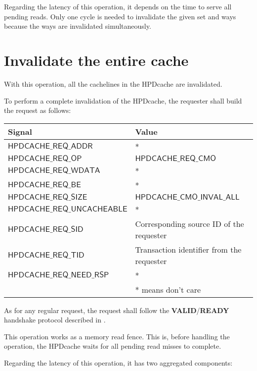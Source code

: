 \documentclass[10pt,titlepage,twoside]{book}
\begin{document}
Regarding the latency of this operation, it depends on the time to serve all pending reads.
Only one cycle is needed to invalidate the given set and ways because the ways are invalidated simultaneously.


\newpage
\section{Invalidate the entire cache}

With this operation, all the cachelines in the \ac{HPDcache} are invalidated.

To perform a complete invalidation of the \ac{HPDcache}, the requester shall build the request as follows:

{\centering\footnotesize\begin{tabular}{p{.38\linewidth}p{.55\linewidth}}
  \toprule
  \textbf{Signal}
  & \textbf{Value} \\
  \midrule
  $\mathsf{HPDCACHE\_REQ\_ADDR}$
  & *\\
  \midrule
  $\mathsf{HPDCACHE\_REQ\_OP}$
  & $\mathsf{HPDCACHE\_REQ\_CMO}$ \\
  \midrule
  $\mathsf{HPDCACHE\_REQ\_WDATA}$
  & *\\
  \midrule
  $\mathsf{HPDCACHE\_REQ\_BE}$
  & *\\
  \midrule
  $\mathsf{HPDCACHE\_REQ\_SIZE}$
  & $\mathsf{HPDCACHE\_CMO\_INVAL\_ALL}$\\
  \midrule
  $\mathsf{HPDCACHE\_REQ\_UNCACHEABLE}$
  & *\\
  \midrule
  $\mathsf{HPDCACHE\_REQ\_SID}$
  & Corresponding source ID of the requester\\
  \midrule
  $\mathsf{HPDCACHE\_REQ\_TID}$
  & Transaction identifier from the requester\\
  \midrule
  $\mathsf{HPDCACHE\_REQ\_NEED\_RSP}$
  & *\\
  \bottomrule
  & * means don't care \\
\end{tabular}}

As for any regular request, the request shall follow the \textbf{VALID}/\textbf{READY} handshake protocol described in .

This operation works as a memory read fence.
This is, before handling the operation, the \ac{HPDcache} waits for all pending read misses to complete.

Regarding the latency of this operation, it has two aggregated components:
\end{document}
